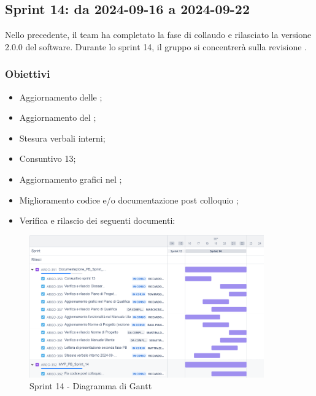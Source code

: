 \subsection{Sprint 14: da 2024-09-16 a 2024-09-22}
\par Nello  precedente, il team ha completato la fase di collaudo e rilasciato la versione 2.0.0 del software. Durante lo sprint 14, il gruppo si concentrerà sulla revisione .

\subsubsection{Obiettivi}
\begin{itemize}
  \item Aggiornamento delle \NdP;
  \item Aggiornamento del \MU;
  \item Stesura verbali interni;
  \item Consuntivo  13;
  \item Aggiornamento grafici nel \PdQ;
  \item Miglioramento codice e/o documentazione post colloquio ;
  \item Verifica e rilascio dei seguenti documenti:
\end{itemize}

\begin{figure}[H]
  \centering
  \includegraphics[width=0.90\textwidth]{assets/Pianificazione/Sprint-14/gantt.png}
  \caption{Sprint 14 - Diagramma di Gantt}\label{fig:sprint-14-gantt}
\end{figure}

